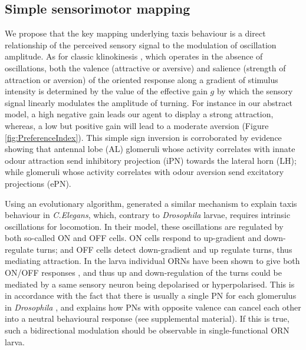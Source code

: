 \documentclass[11pt,a4paper]{article}
\newcommand{\Dros }{\emph{Drosophila }}
\newcommand{\todoAW}[1]{\todo[author=AW,color=green, size=\tiny,inline]{#1}}
\newcommand{\todoBW}[1]{\todo[author=BW,color=orange, size=\tiny,inline]{#1}}
\newcommand{\todoML}[1]{\todo[author=ML,color=white, size=\tiny,inline]{#1}}
\begin{document}
\subsection{Simple sensorimotor mapping}
We propose that the key mapping underlying taxis behaviour is a direct relationship of the perceived sensory signal to the modulation of oscillation amplitude.
As for classic klinokinesis \citep{benhamou1989animals}, which operates in the absence of oscillations, both the valence (attractive or aversive) and salience (strength of attraction or aversion) of the oriented response along a gradient of stimulus intensity is determined by the value of the effective gain $g$ by which the sensory signal linearly modulates the amplitude of turning. For instance in our abstract model, a high negative gain leads our agent to display a strong attraction, whereas, a low but positive gain will lead to a moderate aversion (Figure \ref{fig:PreferenceIndex}). This simple sign inversion is corroborated by evidence showing that antennal lobe (AL) glomeruli whose activity correlates with innate odour attraction send inhibitory projection (iPN) towards the lateral horn (LH); while glomeruli whose activity correlates with odour aversion send excitatory projections (ePN). 
\todoBW{Citation needed!!}

Using an evolutionary algorithm, \cite{izquierdo2010evolution} generated a similar mechanism to explain taxis behaviour in {\it C.Elegans}, which, contrary to \Dros larvae, requires intrinsic oscillations for locomotion.
 In their model, these oscillations are regulated by both so-called ON and OFF cells. ON cells respond to up-gradient and down-regulate turns; and OFF cells detect down-gradient and up regulate turns, thus mediating attraction.
  In the larva individual ORNs have been shown to give both ON/OFF responses \citep{schulze2015dynamical}, and thus up and down-regulation of the turns could be mediated by a same sensory neuron being depolarised or hyperpolarised.
   This is in accordance with the fact that there is usually a single PN for each glomerulus in \Dros \citep{ramaekers2005glomerular}, %
 and explains how PNs with opposite valence can cancel each other into a neutral behavioural response (see supplemental material). If this is true, such a bidirectional modulation should be observable in single-functional ORN larva. 
  
\end{document}
